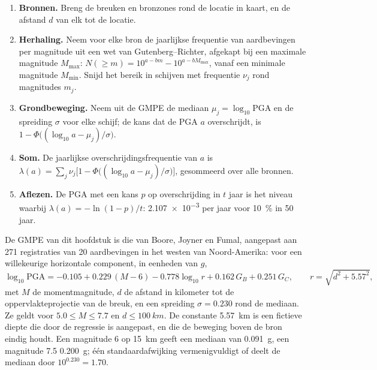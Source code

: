 \begin{method}\label{met:b2:geological-hazards:psha}
\begin{enumerate}
  \item \textbf{Bronnen.} Breng de breuken en bronzones rond de locatie in kaart, en de afstand $d$ van
        elk tot de locatie.
  \item \textbf{Herhaling.} Neem voor elke bron de jaarlijkse frequentie van aardbevingen per magnitude
        uit een wet van Gutenberg--Richter, afgekapt bij een maximale magnitude $M_{\max}$:
        $N(\geq m) = 10^{a - bm} - 10^{a - bM_{\max}}$, vanaf een minimale magnitude $M_{\min}$.
        Snijd het bereik in schijven met frequentie $\nu_j$ rond magnitudes $m_j$.
  \item \textbf{Grondbeweging.} Neem uit de GMPE de mediaan $\mu_j = \log_{10}\mathrm{PGA}$ en
        de spreiding $\sigma$ voor elke schijf; de kans dat de PGA $a$ overschrijdt, is
        $1 - \Phi\bigl((\log_{10} a - \mu_j)/\sigma\bigr)$.
  \item \textbf{Som.} De jaarlijkse overschrijdingsfrequentie van $a$ is $\lambda(a) = \sum_j \nu_j
        \bigl[1 - \Phi\bigl((\log_{10} a - \mu_j)/\sigma\bigr)\bigr]$, gesommeerd over alle bronnen.
  \item \textbf{Aflezen.} De PGA met een kans $p$ op overschrijding in $t$ jaar is het niveau waarbij
        $\lambda(a) = -\ln(1 - p)/t$: \num{2.107e-3} per jaar voor \qty{10}{\percent} in 50 jaar.
\end{enumerate}
\end{method}

De GMPE van dit hoofdstuk is die van Boore, Joyner en Fumal, aangepast aan 271 registraties van 20
aardbevingen in het westen van Noord-Amerika: voor een willekeurige horizontale component, in eenheden van $g$,
\begin{equation}
\log_{10}\mathrm{PGA} = -0.105 + 0.229\,(M - 6) - 0.778\log_{10} r + 0.162\,G_B + 0.251\,G_C,
\qquad r = \sqrt{d^2 + 5.57^2},
\label{eq:b2:geological-hazards:gmpe}
\end{equation}
met $M$ de momentmagnitude, $d$ de afstand in kilometer tot de oppervlakteprojectie van de
breuk, en een spreiding $\sigma = 0.230$ rond de mediaan. Ze geldt voor $5.0 \leq M \leq 7.7$ en $d
\leq \qty{100}{km}$. De constante \qty{5.57}{km} is een fictieve diepte die door de regressie is aangepast,
en die de beweging boven de bron eindig houdt. Een magnitude 6 op \qty{15}{km} geeft een mediaan van
\qty{0.091}{g}, een magnitude 7.5 \qty{0.200}{g}; één standaardafwijking vermenigvuldigt of deelt de
mediaan door $10^{0.230} = 1.70$.

